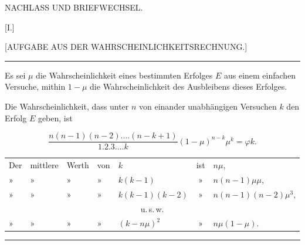 \begin{center}
NACHLASS UND BRIEFWECHSEL.
\end{center}

\begin{center}
[I.]
\end{center}

\begin{center}
[AUFGABE AUS DER WAHRSCHEINLICHKEITSRECHNUNG.]
\end{center}

\bigskip
\hrule
\bigskip

Es sei $\mu$ die Wahrscheinlichkeit eines bestimmten Erfolges $E$ aus einem
einfachen Versuche, mithin $1-\mu$ die Wahrscheinlichkeit des Ausbleibens dieses
Erfolges.

Die Wahrscheinlichkeit, dass unter $n$ von einander unabhängigen Versuchen $k$
den Erfolg $E$ geben, ist

\[
\frac{n(n-1)(n-2)....(n-k+1)}{1.2.3....k}(1-\mu)^{n-k}\mu^k = \varphi k.
\]

\begin{center}
\small\setlength{\tabcolsep}{3pt}
\begin{tabular}{lllllcl}
Der & mittlere & Werth & von & $k$ & ist & $n\mu$, \\
» & » & » & » & $k(k-1)$ & » & $n(n-1)\mu\mu$, \\
» & » & » & » & $k(k-1)(k-2)$ & » & $n(n-1)(n-2)\mu^3$, \\
\multicolumn{7}{c}{u.\,s.\,w.}\\
» & » & » & » & $(k-n\mu)^2$ & » & $n\mu(1-\mu)$. \\
\end{tabular}
\end{center}

\bigskip
\hrule
